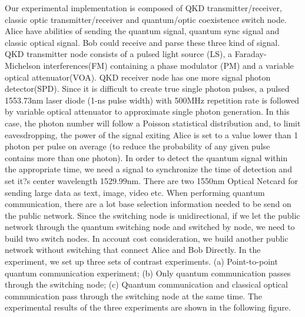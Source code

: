 \documentclass[letterpaper,10pt]{article}
\begin{document}
Our experimental implementation is composed of QKD transmitter/receiver, classic optic transmitter/receiver and quantum/optic coexistence switch node. Alice have abilities of sending the quantum signal, quantum sync signal and classic optical signal. Bob could receive and parse these three kind of signal. QKD transmitter node consists of a pulsed light source (LS), a Faraday-Michelson interferences(FM) containing a phase modulator (PM) and a variable optical attenuator(VOA). QKD receiver node has one more signal photon detector(SPD). Since it is difficult to create true single photon pulses, a pulsed 1553.73nm laser diode (1-ns pulse width) with 500MHz repetition rate is followed by variable optical attenuator to approximate single photon generation. In this case, the photon number will follow a Poisson statistical distribution and, to limit eavesdropping, the power of the signal exiting Alice is set to a value lower than 1 photon per pulse on average (to reduce the probability of  any given pulse contains more than one photon). In order to detect the quantum signal within the appropriate time, we need a signal to synchronize the time of detection and set it?s center wavelength 1529.99nm. There are two 1550nm Optical Netcard for sending large data as text, image, video etc. When performing quantum communication, there are a lot base selection information needed to be send on the public network. Since the switching node is unidirectional, if we let the public network through the quantum switching node and switched by node, we need to build two switch nodes. In account cost consideration, we build another public network without switching  that connect Alice and Bob Directly. In the experiment, we set up three sets of contrast experiments. (a) Point-to-point quantum communication experiment; (b) Only quantum communication passes through the switching node; (c) Quantum communication and classical optical communication pass through the switching node at the same time. The experimental results of the three experiments are shown in the following figure.
\end{document}
